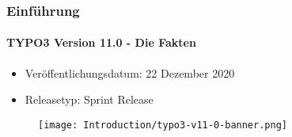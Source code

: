 %

\begin{frame}[fragile]
	\frametitle{Einführung}
	\framesubtitle{TYPO3 Version 11.0 - Die Fakten}

	\begin{itemize}
		\item Veröffentlichungsdatum: 22 Dezember 2020
		\item Releasetyp: Sprint Release
	\end{itemize}

	\begin{figure}
		\texttt{[image: Introduction/typo3-v11-0-banner.png]}
	\end{figure}

\end{frame}

